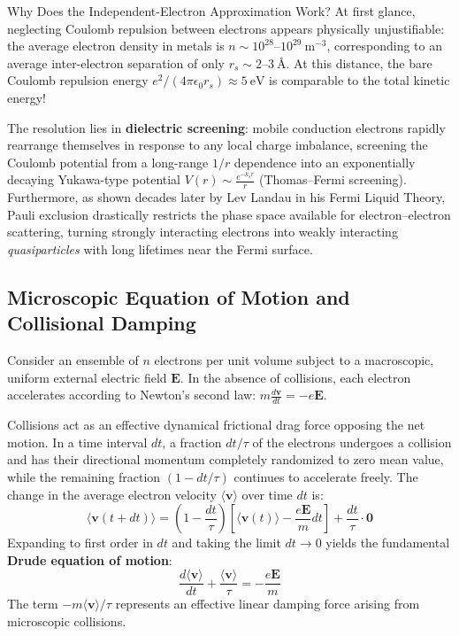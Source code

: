 \documentclass[11pt,a4paper]{article}
\newcommand{\vb}[1]{\mathbf{#1}}
\begin{document}
\begin{checkpointbox}{Why Does the Independent-Electron Approximation Work?}
At first glance, neglecting Coulomb repulsion between electrons appears physically unjustifiable: the average electron density in metals is $n \sim 10^{28}\text{--}10^{29}\ \mathrm{m}^{-3}$, corresponding to an average inter-electron separation of only $r_s \sim 2\text{--}3\ \text{\AA}$. At this distance, the bare Coulomb repulsion energy $e^2/(4\pi\epsilon_0 r_s) \approx 5\ \mathrm{eV}$ is comparable to the total kinetic energy!

The resolution lies in \textbf{dielectric screening}: mobile conduction electrons rapidly rearrange themselves in response to any local charge imbalance, screening the Coulomb potential from a long-range $1/r$ dependence into an exponentially decaying Yukawa-type potential $V(r) \sim \frac{e^{-k_s r}}{r}$ (Thomas--Fermi screening). Furthermore, as shown decades later by Lev Landau in his Fermi Liquid Theory, Pauli exclusion drastically restricts the phase space available for electron--electron scattering, turning strongly interacting electrons into weakly interacting \emph{quasiparticles} with long lifetimes near the Fermi surface.
\end{checkpointbox}

\subsection{Microscopic Equation of Motion and Collisional Damping}
Consider an ensemble of $n$ electrons per unit volume subject to a macroscopic, uniform external electric field $\vb{E}$. In the absence of collisions, each electron accelerates according to Newton's second law: $m \frac{d\vb{v}}{dt} = -e\vb{E}$.

Collisions act as an effective dynamical frictional drag force opposing the net motion. In a time interval $dt$, a fraction $dt/\tau$ of the electrons undergoes a collision and has their directional momentum completely randomized to zero mean value, while the remaining fraction $(1 - dt/\tau)$ continues to accelerate freely. The change in the average electron velocity $\langle \vb{v} \rangle$ over time $dt$ is:
\begin{equation}
\langle \vb{v}(t+dt) \rangle = \left(1 - \frac{dt}{\tau}\right) \left[ \langle \vb{v}(t) \rangle - \frac{e\vb{E}}{m}dt \right] + \frac{dt}{\tau} \cdot \vb{0}
\end{equation}
Expanding to first order in $dt$ and taking the limit $dt \to 0$ yields the fundamental \textbf{Drude equation of motion}:
\begin{equation}
\frac{d\langle\vb{v}\rangle}{dt} + \frac{\langle\vb{v}\rangle}{\tau} = -\frac{e\vb{E}}{m}
\label{eq:drude_eom}
\end{equation}
The term $-m\langle\vb{v}\rangle/\tau$ represents an effective linear damping force arising from microscopic collisions.
\end{document}
